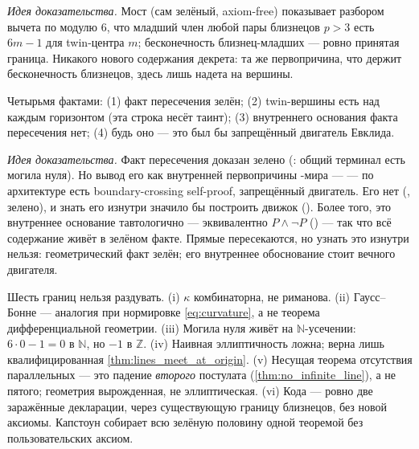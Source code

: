 \emph{Идея доказательства.} Мост  (сам зелёный, axiom-free) показывает
разбором вычета по модулю $6$, что младший член любой пары близнецов $p > 3$ есть $6m - 1$ для
twin-центра $m$; бесконечность близнец-младших --- ровно принятая граница. Никакого нового содержания
декрета: та же первопричина, что держит бесконечность близнецов, здесь лишь надета на вершины.

\begin{theorem}\label{thm:lines_meet_but_unknowable_from_inside}
\yellow{} Четырьмя фактами: (1) факт пересечения зелён; (2) twin-вершины есть над каждым горизонтом
(эта строка несёт таинт); (3) внутреннего основания факта пересечения нет; (4) будь оно --- это был бы
запрещённый двигатель Евклида.
\end{theorem}

\emph{Идея доказательства.} Факт пересечения  доказан зелено
(: общий терминал есть могила нуля). Но вывод его как внутренней
первопричины -мира ---  --- по архитектуре есть
boundary-crossing self-proof, запрещённый двигатель. Его нет (,
зелено), и знать его изнутри значило бы построить движок (). Более
того, это внутреннее основание тавтологично --- эквивалентно $P \wedge \neg P$
() --- так что всё содержание живёт в зелёном факте. Прямые
пересекаются, но узнать это изнутри нельзя: геометрический факт зелён; его внутреннее обоснование стоит
вечного двигателя.

\begin{remark}
Шесть границ нельзя раздувать. (i) $\kappa$ комбинаторна, не риманова. (ii) Гаусс--Бонне --- аналогия
при нормировке \cref{eq:curvature}, а не теорема дифференциальной геометрии. (iii) Могила нуля живёт на
$\mathbb{N}$-усечении: $6\cdot 0 - 1 = 0$ в $\mathbb{N}$, но $-1$ в $\mathbb{Z}$. (iv) Наивная
эллиптичность ложна; верна лишь квалифицированная \cref{thm:lines_meet_at_origin}. (v) Несущая теорема
отсутствия параллельных --- это падение \emph{второго} постулата (\cref{thm:no_infinite_line}), а не
пятого; геометрия вырожденная, не эллиптическая. (vi) Кода --- ровно две заражённые декларации, через
существующую границу близнецов, без новой аксиомы. Капстоун  собирает
всю зелёную половину одной теоремой без пользовательских аксиом.
\end{remark}

